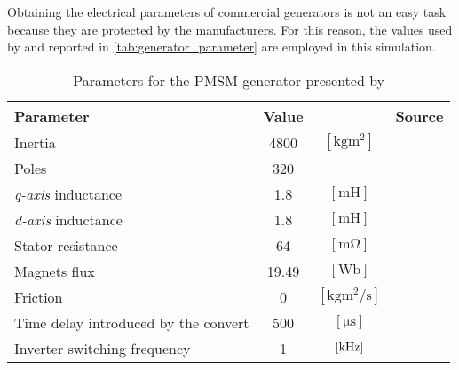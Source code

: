  Obtaining the electrical parameters of commercial generators is not an easy task because they are protected by the manufacturers. For this reason, the values used by \cite{10-MW_Direct-Drive_PMSG-Based_Wind_Energy_Conversion_System_Model} and reported in \autoref{tab:generator_parameter} are employed in this simulation.
\begin{table}[htb]
    \caption{Parameters for the \acrlong{PMSM} generator presented by \cite{10-MW_Direct-Drive_PMSG-Based_Wind_Energy_Conversion_System_Model}}
    \centering
    \begin{tabular}{lccc}
    \toprule
    Parameter & Value & & Source\\ \midrule
    Inertia & 4800 & $\left[\si{\kilo\gram\square\meter}\right]$ & \cite{the_switch_datasheet} \\ \midrule	
    Poles & 320 & & \multirow{5}{*}{\cite{10-MW_Direct-Drive_PMSG-Based_Wind_Energy_Conversion_System_Model}} \\
    \textit{q-axis} inductance & 1.8 & $\left[\si{\milli\henry}\right]$ & \\
    \textit{d-axis} inductance & 1.8 & $\left[\si{\milli\henry}\right]$ &\\
    Stator resistance & 64 & $\left[\si{\milli\ohm}\right]$ &\\
    Magnets flux & 19.49 & $\left[\si{\weber}\right]$ &\\ \midrule
    Friction & 0 & $\left[\si{\kilo\gram\square\meter\per\second}\right]$ & \\
    Time delay introduced by the convert & 500 & $\left[\si{\micro\second}\right]$ & \\
    Inverter switching frequency & 1 & $\left[\si{\kilo\hertz}\right]$ & \\
    \bottomrule
    \end{tabular}
    \label{tab:generator_parameter}
\end{table}

